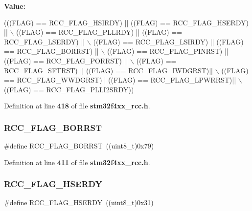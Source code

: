 {\bfseries Value\+:}
\begin{DoxyCode}
(((FLAG) == RCC_FLAG_HSIRDY) || ((FLAG) == RCC_FLAG_HSERDY) || \(\backslash\)
                           ((FLAG) == RCC_FLAG_PLLRDY) || ((FLAG) == 
      RCC_FLAG_LSERDY) || \(\backslash\)
                           ((FLAG) == RCC_FLAG_LSIRDY) || ((FLAG) == 
      RCC_FLAG_BORRST) || \(\backslash\)
                           ((FLAG) == RCC_FLAG_PINRST) || ((FLAG) == 
      RCC_FLAG_PORRST) || \(\backslash\)
                           ((FLAG) == RCC_FLAG_SFTRST) || ((FLAG) == 
      RCC_FLAG_IWDGRST)|| \(\backslash\)
                           ((FLAG) == RCC_FLAG_WWDGRST)|| ((FLAG) == 
      RCC_FLAG_LPWRRST)|| \(\backslash\)
                           ((FLAG) == RCC_FLAG_PLLI2SRDY))
\end{DoxyCode}


Definition at line \textbf{ 418} of file \textbf{ stm32f4xx\+\_\+rcc.\+h}.

\mbox{\label{group__RCC__Flag_ga23d5211abcdf0e397442ca534ca04bb4}} 
\subsubsection{R\+C\+C\+\_\+\+F\+L\+A\+G\+\_\+\+B\+O\+R\+R\+ST}
{\footnotesize\ttfamily \#define R\+C\+C\+\_\+\+F\+L\+A\+G\+\_\+\+B\+O\+R\+R\+ST~((uint8\+\_\+t)0x79)}



Definition at line \textbf{ 411} of file \textbf{ stm32f4xx\+\_\+rcc.\+h}.

\mbox{\label{group__RCC__Flag_ga173edf47bec93cf269a0e8d0fec9997c}} 
\subsubsection{R\+C\+C\+\_\+\+F\+L\+A\+G\+\_\+\+H\+S\+E\+R\+DY}
{\footnotesize\ttfamily \#define R\+C\+C\+\_\+\+F\+L\+A\+G\+\_\+\+H\+S\+E\+R\+DY~((uint8\+\_\+t)0x31)}



